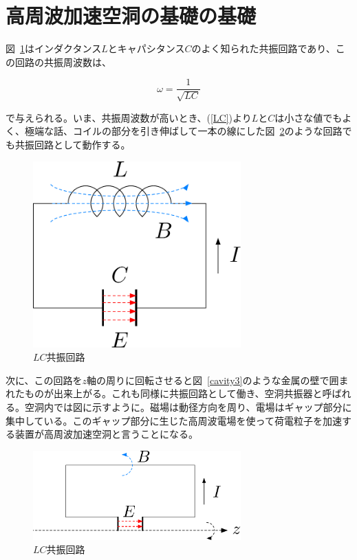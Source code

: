 \documentclass[10pt,a4paper]{ltjsarticle}
\begin{document}
\section{高周波加速空洞の基礎の基礎}
図~\ref{cavity1}はインダクタンス$L$とキャパシタンス$C$のよく知られた共振回路であり、この回路の共振周波数は、

\begin{equation}
  \omega = \frac{1}{\sqrt{LC}}
  \label{LC}
\end{equation}

で与えられる。いま、共振周波数が高いとき、(\ref{LC})より$L$と$C$は小さな値でもよく、極端な話、コイルの部分を引き伸ばして一本の線にした図~\ref{cavity2}のような回路でも共振回路として動作する。

\begin{figure}[hbt]
  \begin{center}
    \includegraphics[width=8cm,clip]{cavity1.pdf}
    \caption{$LC$共振回路}
   \label{cavity1}
  \end{center}
\end{figure}

次に、この回路を$z$軸の周りに回転させると図~\ref{cavity3}のような金属の壁で囲まれたものが出来上がる。これも同様に共振回路として働き、空洞共振器と呼ばれる。空洞内では図に示すように。磁場は動径方向を周り、電場はギャップ部分に集中している。このギャップ部分に生じた高周波電場を使って荷電粒子を加速する装置が高周波加速空洞と言うことになる。

\begin{figure}[hbt]
  \begin{center}
    \includegraphics[width=8cm,clip]{cavity2.pdf}
    \caption{$LC$共振回路}
   \label{cavity2}
  \end{center}
\end{figure}
\end{document}
